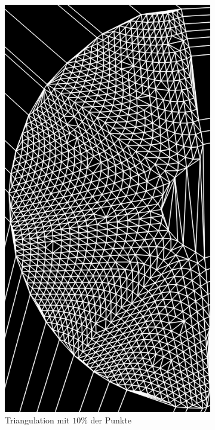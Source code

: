 \begin{figure}[!htb]
	\centering
	\begin{subfigure}{.9\textwidth}
		\centering
		\includegraphics[angle=-90, width=.8\textwidth]{images/delaunay1.png}
		\caption{Triangulation mit $10\%$ der Punkte}
	\end{subfigure}
	\begin{subfigure}{.9\textwidth}
		\centering

\end{subfigure}
\end{figure}

